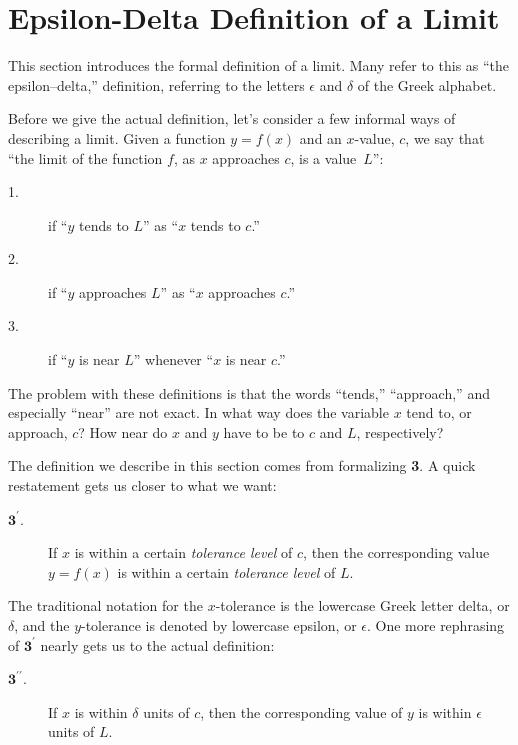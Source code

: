 
\section{Epsilon-Delta Definition of a Limit}\label{sec:limit_def}

This section introduces the formal definition of a limit. Many refer to this as ``the epsilon--delta,'' definition, referring to the letters $\epsilon$ and $\delta$ of the Greek alphabet.\bigskip

Before we give the actual definition, let's consider a few informal ways of describing a limit.  Given a function $y=f(x)$ and an $x$-value, $c$, we say that ``the limit of the function $f$, as $x$ approaches $c$, is a value~$L$'': 

\begin{description}
\item[1.]if ``$y$ tends to $L$'' as ``$x$ tends to $c$.''
\item[2.]if ``$y$ approaches $L$'' as ``$x$ approaches $c$.''
\item[3.]if ``$y$ is near $L$'' whenever ``$x$ is near $c$.''
\end{description}

The problem with these definitions is that the words ``tends,'' ``approach,'' and especially ``near'' are not exact.  In what way does the variable $x$ tend to, or approach, $c$? How near do $x$ and $y$ have to be to $c$ and $L$, respectively?\bigskip

The definition we describe in this section comes from formalizing \textbf{3}.  A quick restatement gets us closer to what we want:

\begin{description}
\item[$\textbf{3}^\prime$.]If $x$ is within a certain \textit{tolerance level} of $c$, then the corresponding value $y=f(x)$ is within a certain \textit{tolerance level} of $L$.
\end{description}

The traditional notation for the $x$-tolerance is the lowercase Greek letter delta, or $\delta$, and the $y$-tolerance is denoted by lowercase epsilon, or $\epsilon$. One more rephrasing of $\textbf{3}^\prime$ nearly gets us to the actual definition:

\begin{description}
\item[$\textbf{3}^{\prime \prime}$.]If $x$ is within $\delta$ units of $c$, then the corresponding value of $y$ is within $\epsilon$ units of $L$.
\end{description}

